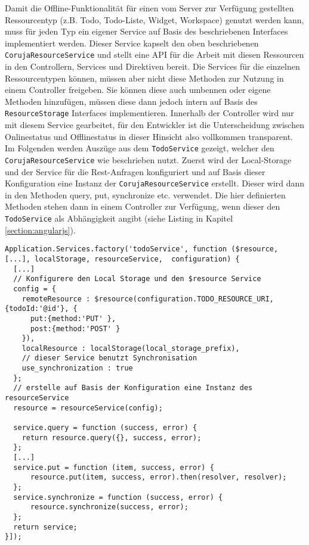 Damit die Offline-Funktionalität für einen vom Server zur Verfügung gestellten Ressourcentyp (z.B. Todo, Todo-Liste, Widget, Workspace) genutzt werden kann, muss für jeden Typ ein eigener Service auf Basis des beschriebenen Interfaces implementiert werden. Dieser Service kapselt den oben beschriebenen \texttt{CorujaResourceService} und stellt eine API für die Arbeit mit diesen Ressourcen in den Controllern, Services und Direktiven bereit. Die Services für die einzelnen Ressourcentypen können, müssen aber nicht diese Methoden zur Nutzung in einem Controller freigeben. Sie können diese auch umbennen oder eigene Methoden hinzufügen, müssen diese dann jedoch intern auf Basis des \texttt{ResourceStorage} Interfaces implementieren. Innerhalb der Controller wird nur mit diesem Service gearbeitet, für den Entwickler ist die Unterscheidung zwischen Onlinestatus und Offlinestatus in dieser Hinsicht also vollkommen transparent. Im Folgenden werden Auszüge aus dem \texttt{TodoService} gezeigt, welcher den \texttt{CorujaResourceService} wie beschrieben nutzt. Zuerst wird der Local-Storage und der Service für die Rest-Anfragen konfiguriert und auf Basis dieser Konfiguration eine Instanz der \texttt{CorujaResourceService} erstellt. Dieser wird dann in den Methoden query, put, synchronize etc. verwendet. Die hier definierten Methoden stehen dann in einem Controller zur Verfügung, wenn dieser den \texttt{TodoService} als Abhängigkeit angibt (siehe Listing in Kapitel \ref{section:angularjs}).
\begin{lstlisting}
Application.Services.factory('todoService', function ($resource, [...], localStorage, resourceService,  configuration) {
  [...]
  // Konfigurere den Local Storage und den $resource Service
  config = {
    remoteResource : $resource(configuration.TODO_RESOURCE_URI, {todoId:'@id'}, {
      put:{method:'PUT' },
      post:{method:'POST' }
    }),
    localResource : localStorage(local_storage_prefix),
    // dieser Service benutzt Synchronisation
    use_synchronization : true
  };   
  // erstelle auf Basis der Konfiguration eine Instanz des resourceService
  resource = resourceService(config);
    
  service.query = function (success, error) {
    return resource.query({}, success, error);
  }; 
  [...]
  service.put = function (item, success, error) {
      resource.put(item, success, error).then(resolver, resolver);
  };  
  service.synchronize = function (success, error) {
      resource.synchronize(success, error);
  };
  return service;
}]);
\end{lstlisting}


